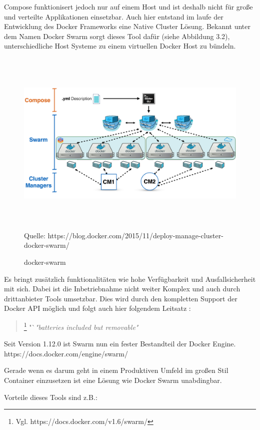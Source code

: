 \documentclass[12pt,toc=bib,toc=listof]{scrreprt}
\begin{document}
Compose funktionisert jedoch nur auf einem Host und ist deshalb nicht für große und verteilte Applikationen einsetzbar.
Auch hier entstand im laufe der Entwicklung des Docker Frameworks eine Native Cluster Lösung.
Bekannt unter dem Namen Docker Swarm sorgt dieses Tool dafür (siehe Abbildung 3.2), unterschiedliche Host Systeme zu einem virtuellen Docker Host zu bündeln.


\begin{figure}
	\centering
	\caption{docker-swarm}
	\includegraphics[width=15cm, height=9cm, scale=0.3]{docker-swarm.png}
	Quelle: https://blog.docker.com/2015/11/deploy-manage-cluster-docker-swarm/
\end{figure}

Es bringt zusätzlich funktionalitäten wie hohe Verfügbarkeit und Ausfallsicherheit mit sich.
Dabei ist die Inbetriebnahme nicht weiter Komplex und auch durch drittanbieter Tools umsetzbar.
Dies wird durch den kompletten Support der Docker API möglich und folgt auch hier folgendem Leitsatz :

\begin{quote}
	\footnote[1]{Vgl. https://docs.docker.com/v1.6/swarm/}
	"`\textit{"batteries included but removable"}
\end{quote}

Seit Version 1.12.0 ist Swarm nun ein fester Bestandteil der Docker Engine.
https://docs.docker.com/engine/swarm/






Gerade wenn es darum geht in einem Produktiven Umfeld im großen Stil Container einzusetzen ist eine Lösung wie Docker Swarm unabdingbar.

Vorteile dieses Tools sind z.B.:
\end{document}
